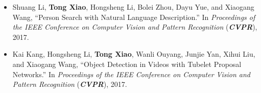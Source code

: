 \begin{itemize}
  \item Shuang Li, \textbf{Tong Xiao}, Hongsheng Li, Bolei Zhou, Dayu Yue, and Xiaogang Wang, ``Person Search with Natural Language Description.'' In \textit{Proceedings of the IEEE Conference on Computer Vision and Pattern Recognition} (\textit{\textbf{CVPR}}), 2017.

  \item Kai Kang, Hongsheng Li, \textbf{Tong Xiao}, Wanli Ouyang, Junjie Yan, Xihui Liu, and Xiaogang Wang, ``Object Detection in Videos with Tubelet Proposal Networks.'' In \textit{Proceedings of the IEEE Conference on Computer Vision and Pattern Recognition} (\textit{\textbf{CVPR}}), 2017.

\end{itemize}
